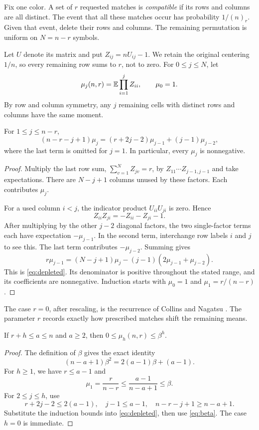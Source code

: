 Fix one color. A set of $r$ requested matches is \emph{compatible} if its rows and columns are all distinct. The event that all these matches occur has probability $1/(n)_r$. Given that event, delete their rows and columns. The remaining permutation is uniform on $N=n-r$ symbols.

Let $U$ denote its matrix and put $Z_{ij}=nU_{ij}-1$. We retain the original centering $1/n$, so every remaining row sums to $r$, not to zero. For $0\le j\le N$, let
\[
\mu_j(n,r)=\mathbb E\prod_{i=1}^j Z_{ii},\qquad \mu_0=1.
\]
By row and column symmetry, any $j$ remaining cells with distinct rows and columns have the same moment.

\begin{lemma}\label{lem:depleted}
For $1\le j\le n-r$,
\begin{equation}\label{eq:depleted}
(n-r-j+1)\mu_j=(r+2j-2)\mu_{j-1}+(j-1)\mu_{j-2},
\end{equation}
where the last term is omitted for $j=1$. In particular, every $\mu_j$ is nonnegative.
\end{lemma}
\begin{proof}
Multiply the last row sum, $\sum_{v=1}^{N}Z_{jv}=r$, by $Z_{11}\cdots Z_{j-1,j-1}$ and take expectations. There are $N-j+1$ columns unused by these factors. Each contributes $\mu_j$.

For a used column $i<j$, the indicator product $U_{ii}U_{ji}$ is zero. Hence
\[
Z_{ii}Z_{ji}=-Z_{ii}-Z_{ji}-1.
\]
After multiplying by the other $j-2$ diagonal factors, the two single-factor terms each have expectation $-\mu_{j-1}$. In the second term, interchange row labels $i$ and $j$ to see this. The last term contributes $-\mu_{j-2}$. Summing gives
\[
r\mu_{j-1}=(N-j+1)\mu_j-(j-1)(2\mu_{j-1}+\mu_{j-2}).
\]
This is \eqref{eq:depleted}. Its denominator is positive throughout the stated range, and its coefficients are nonnegative. Induction starts with $\mu_0=1$ and $\mu_1=r/(n-r)$.
\end{proof}

The case $r=0$, after rescaling, is the recurrence of Collins and Nagatsu \cite[Proposition 3.3, equation (16)]{CN}. The parameter $r$ records exactly how prescribed matches shift the remaining means.

\begin{lemma}\label{lem:super}
If $r+h\le a\le n$ and $a\ge2$, then $0\le\mu_h(n,r)\le\beta^h$.
\end{lemma}
\begin{proof}
The definition of $\beta$ gives the exact identity
\begin{equation}\label{eq:beta}
(n-a+1)\beta^2=2(a-1)\beta+(a-1).
\end{equation}
For $h\ge1$, we have $r\le a-1$ and
\[
\mu_1=\frac r{n-r}\le\frac{a-1}{n-a+1}\le\beta.
\]
For $2\le j\le h$, use
\[
r+2j-2\le2(a-1),\quad j-1\le a-1,\quad n-r-j+1\ge n-a+1.
\]
Substitute the induction bounds into \eqref{eq:depleted}, then use \eqref{eq:beta}. The case $h=0$ is immediate.
\end{proof}

